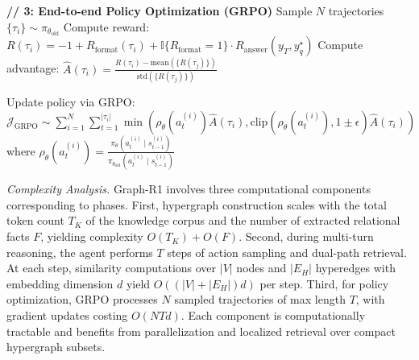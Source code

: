 \documentclass{article}
\theoremstyle{plain}
\theoremstyle{definition}
\theoremstyle{remark}
\begin{document}
\begin{algorithm}[h!t]
\begin{algorithmic}[1]
\vspace{1mm}
\State \textbf{// 3: End-to-end Policy Optimization (GRPO)}
\State Sample $N$ trajectories $\{\tau_i\} \sim \pi_{\theta_{\text{old}}}$
    \State Compute reward:
    $R(\tau_i) = -1 + R_{\text{format}}(\tau_i) + \mathbb{I}\{R_{\text{format}}=1\} \cdot R_{\text{answer}}(y_T, y_q^\star)$
    \State Compute advantage:
    $\hat{A}(\tau_i) = \frac{R(\tau_i) - \mathrm{mean}(\{R(\tau_j)\})}{\mathrm{std}(\{R(\tau_j)\})}$
\EndFor

\State Update policy via GRPO:
$\mathcal{J}_{\text{GRPO}} \sim \sum_{i=1}^N \sum_{t=1}^{|\tau_i|} 
\min\left(
\rho_\theta(a_t^{(i)}) \hat{A}(\tau_i), 
\text{clip}(\rho_\theta(a_t^{(i)}), 1 \pm \epsilon) \hat{A}(\tau_i)
\right)$
\State where
$\rho_\theta(a_t^{(i)}) = \frac{\pi_\theta(a_t^{(i)} \mid s_{t-1}^{(i)})}{\pi_{\theta_{\text{old}}}(a_t^{(i)} \mid s_{t-1}^{(i)})}$

\end{algorithmic}
\end{algorithm}
\vspace{-0.5mm}

\textit{Complexity Analysis. }
Graph-R1 involves three computational components corresponding to phases. 
First, hypergraph construction scales with the total token count $T_K$ of the knowledge corpus and the number of extracted relational facts $F$, yielding complexity $O(T_K) + O(F)$. 
Second, during multi-turn reasoning, the agent performs $T$ steps of action sampling and dual-path retrieval. At each step, similarity computations over $|V|$ nodes and $|E_H|$ hyperedges with embedding dimension $d$ yield $O((|V| + |E_H|)d)$ per step. 
Third, for policy optimization, GRPO processes $N$ sampled trajectories of max length $T$, with gradient updates costing $O(NTd)$. 
Each component is computationally tractable and benefits from parallelization and localized retrieval over compact hypergraph subsets.
\end{document}
